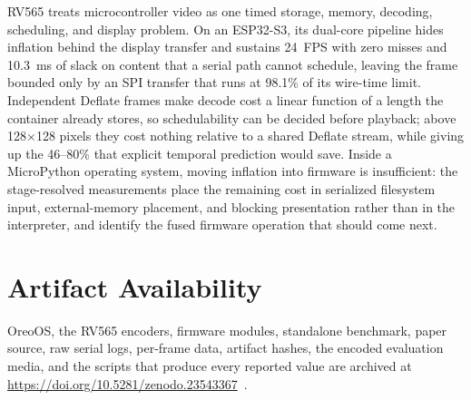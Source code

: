 \documentclass[11pt,twocolumn]{article}
\newcommand{\system}{RV565}
\newcommand{\artifactdoi}{10.5281/zenodo.23543367}
\begin{document}
\system{} treats microcontroller video as one timed storage, memory,
decoding, scheduling, and display problem.  On an ESP32-S3, its dual-core
pipeline hides inflation behind the display transfer and sustains 24~FPS with
zero misses and 10.3~ms of slack on content that a serial path cannot
schedule, leaving the frame bounded only by an SPI transfer that runs at
98.1\% of its wire-time limit.  Independent Deflate frames make decode cost a
linear function of a length the container already stores, so schedulability
can be decided before playback; above 128$\times$128 pixels they cost nothing
relative to a shared Deflate stream, while giving up the 46--80\% that
explicit temporal prediction would save.  Inside a MicroPython operating
system, moving inflation into firmware is insufficient: the stage-resolved
measurements place the remaining cost in serialized filesystem input,
external-memory placement, and blocking presentation rather than in the
interpreter, and identify the fused firmware operation that should come next.

\section*{Artifact Availability}

OreoOS, the \system{} encoders, firmware modules, standalone benchmark, paper
source, raw serial logs, per-frame data, artifact hashes, the encoded
evaluation media, and the scripts that produce every reported value are
archived at \url{https://doi.org/\artifactdoi}~\cite{bhattacharya2026oreo}.

\begingroup
\fontsize{7pt}{7.4pt}\selectfont


\endgroup
\end{document}

